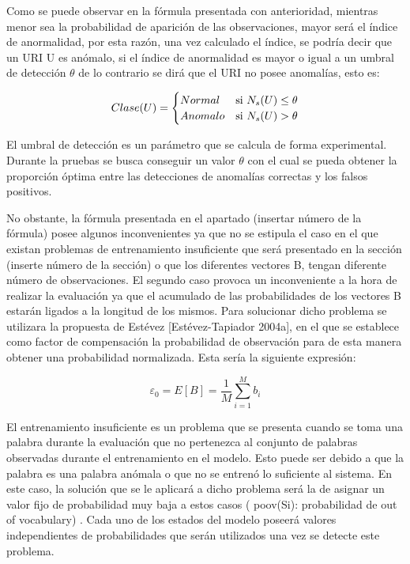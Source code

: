 Como se puede observar en la fórmula presentada con anterioridad, mientras menor sea la probabilidad de aparición de las observaciones, mayor será el índice de anormalidad, por esta razón, una vez calculado el índice, se podría decir que un URI U es anómalo, si el índice de anormalidad es mayor o igual a un umbral de detección $\theta$ de lo contrario se dirá que el URI no posee anomalías, esto es:

\begin{equation}\label{eq:ClaseU}
Clase(U) = 
	\begin{cases} 
      Normal & $si $  N_{s}(U) \leq \theta \\
      Anomalo & $si $  N_{s}(U) > \theta \\ 
   \end{cases}
\end{equation}


El umbral de detección es un parámetro que se calcula de forma experimental. Durante la pruebas se busca conseguir un valor $\theta$ con el cual se pueda obtener la proporción óptima entre las detecciones de anomalías correctas y los falsos positivos. 


No obstante, la fórmula presentada en el apartado (insertar número de la fórmula) posee algunos inconvenientes ya que no se estipula el caso en el que existan problemas de entrenamiento insuficiente que será presentado en la sección (inserte número de la sección) o que los diferentes vectores B, tengan diferente número de observaciones. El segundo caso provoca un inconveniente a la hora de realizar la evaluación ya que el acumulado de las probabilidades de los vectores B estarán ligados a la longitud de los mismos. Para solucionar dicho problema se utilizara la propuesta de Estévez [Estévez-Tapiador 2004a], en el que se establece como factor de compensación la probabilidad de observación para de esta manera obtener una probabilidad normalizada. Esta sería la siguiente expresión:

\begin{equation}\label{eq:sumB}
\varepsilon_{0} = E[B] = \frac{1}{M}\sum_{i=1}^{M}b_{i}
\end{equation}

El entrenamiento insuficiente es un problema que se presenta cuando se toma una palabra durante la evaluación que no pertenezca al conjunto de palabras observadas durante el entrenamiento en el modelo. Esto puede ser debido a que la palabra es una palabra anómala o que no se entrenó lo suficiente al sistema. En este caso, la solución que se le aplicará a dicho problema será la de asignar un valor fijo de probabilidad muy baja a estos casos ( poov(Si): probabilidad de out of vocabulary) . Cada uno de los estados del modelo poseerá valores independientes de probabilidades que serán utilizados una vez se detecte este problema.

